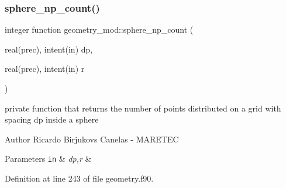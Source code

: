 \subsubsection{\texorpdfstring{sphere\+\_\+np\+\_\+count()}{sphere\_np\_count()}}
{\footnotesize\ttfamily integer function geometry\+\_\+mod\+::sphere\+\_\+np\+\_\+count (\begin{DoxyParamCaption}\item[{real(prec), intent(in)}]{dp,  }\item[{real(prec), intent(in)}]{r }\end{DoxyParamCaption})\hspace{0.3cm}{\ttfamily [private]}}



private function that returns the number of points distributed on a grid with spacing dp inside a sphere 

\begin{DoxyAuthor}{Author}
Ricardo Birjukovs Canelas -\/ M\+A\+R\+E\+T\+EC
\end{DoxyAuthor}

\begin{DoxyParams}[1]{Parameters}
\mbox{\tt in}  & {\em dp,r} & \\
\hline
\end{DoxyParams}


Definition at line 243 of file geometry.\+f90.


